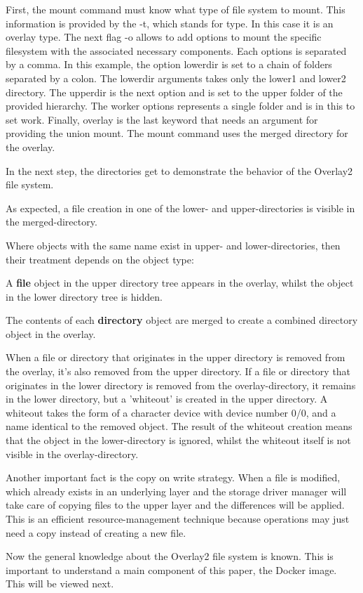 First, the mount command must know what type of file system to mount. This information is provided by the -t, which stands for type. In this case it is an overlay type. The next flag -o allows to add options to mount the specific filesystem with the associated necessary components. Each options is separated by a comma. In this example, the option lowerdir is set to a chain of folders separated by a colon. The lowerdir arguments takes only the lower1 and lower2 directory. The upperdir is the next option and is set to the upper folder of the provided hierarchy. The worker options represents a single folder and is in this to set work. Finally, overlay is the last keyword that needs an argument for providing the union mount. The mount command uses the merged directory for the overlay.

In the next step, the directories get to demonstrate the behavior of the Overlay2 file system.



As expected, a file creation in one of the lower- and upper-directories is visible in the merged-directory.

Where objects with the same name exist in upper- and lower-directories, then their treatment depends on the object type:

A \textbf{file} object in the upper directory tree appears in the overlay, whilst the object in the lower directory tree is hidden.

The contents of each \textbf{directory}  object are merged to create a combined directory object in the overlay.

When a file or directory that originates in the upper directory is removed from the overlay, it's also removed from the upper directory. If a file or directory that originates in the lower directory is removed from the overlay-directory, it remains in the lower directory, but a 'whiteout' is created in the upper directory. A whiteout takes the form of a character device with device number 0/0, and a name identical to the removed object. The result of the whiteout creation means that the object in the lower-directory is ignored, whilst the whiteout itself is not visible in the overlay-directory. 

Another important fact is the copy on write strategy. When a file is modified, which already exists in an underlying layer and the storage driver manager will take care of copying files to the upper layer and the differences will be applied. This is an efficient resource-management technique because operations may just need a copy instead of creating a new file.
	
Now the general knowledge about the Overlay2 file system is known. This is important to understand a main component of this paper, the Docker image. This will be viewed next.
